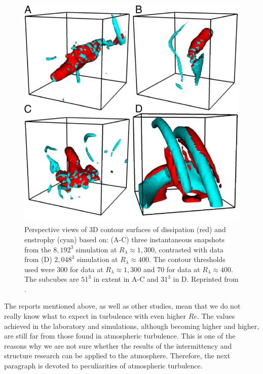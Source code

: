 \documentclass[../main.tex]{subfiles}
\begin{document}
\begin{figure}
\centering
\noindent \includegraphics[width=30pc]{gfx/Yeung_chunky_vortices.png}
\caption{Perspective views of 3D contour surfaces of dissipation (red) and enstrophy (cyan) based on: (A-C) three instantaneous snapshots from the $8,192^3$ simulation at $R_\lambda \approx 1,300$, contrasted with data from (D) $2,048^3$ simulation at $R_\lambda \approx 400$. The contour thresholds used were 300 for data at $R_\lambda \approx 1,300$ and 70 for data at $R_\lambda \approx 400$. The subcubes are $51^3$ in extent in A-C and $31^3$ in D. Reprinted from \citet{Yeung2015}.}
\label{fig:ch1_03}
\end{figure}

The reports mentioned above, as well as other studies, mean that we do not really know what to expect in turbulence with even higher $Re$. The values achieved in the laboratory and simulations, although becoming higher and higher, are still far from those found in atmospheric turbulence. This is one of the reasons why we are not sure whether the results of the intermittency and structure research can be applied to the atmosphere. Therefore, the next paragraph is devoted to peculiarities of atmospheric turbulence.
 
\end{document}
